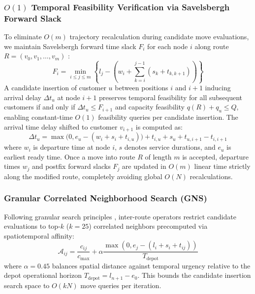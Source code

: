 \documentclass{ieeeaccess}
\begin{document}
\subsubsection{\texorpdfstring{$O(1)$}{O(1)} Temporal Feasibility Verification via Savelsbergh Forward Slack}
To eliminate $O(m)$ trajectory recalculation during candidate move evaluations, we maintain Savelsbergh forward time slack $F_i$ for each node $i$ along route $R = (v_0, v_1, \dots, v_m)$ \cite{savelsbergh1992general}:
\begin{equation}
  F_i = \min_{i \le j \le m} \left\{ l_j - \left( w_i + \sum_{k=i}^{j-1} (s_k + t_{k, k+1}) \right) \right\}
  \label{eq:forward_slack}
\end{equation}
A candidate insertion of customer $u$ between positions $i$ and $i+1$ inducing arrival delay $\Delta t_u$ at node $i+1$ preserves temporal feasibility for all subsequent customers if and only if $\Delta t_u \le F_{i+1}$ and capacity feasibility $q(R) + q_u \le Q$, enabling constant-time $O(1)$ feasibility queries per candidate insertion. The arrival time delay shifted to customer $v_{i+1}$ is computed as:
\begin{equation}
  \Delta t_u = \max\bigl(0, e_u - (w_i + s_i + t_{i, u})\bigr) + t_{i, u} + s_u + t_{u, i+1} - t_{i, i+1}
  \label{eq:delta_t_insertion}
\end{equation}
where $w_i$ is departure time at node $i$, $s$ denotes service durations, and $e_u$ is earliest ready time. Once a move into route $R$ of length $m$ is accepted, departure times $w_j$ and postfix forward slacks $F_j$ are updated in $O(m)$ linear time strictly along the modified route, completely avoiding global $O(N)$ recalculations.

\subsubsection{Granular Correlated Neighborhood Search (GNS)}
Following granular search principles \cite{toth2003granular}, inter-route operators restrict candidate evaluations to top-$k$ ($k=25$) correlated neighbors precomputed via spatiotemporal affinity:
\begin{equation}
  \mathcal{A}_{ij} = \frac{c_{ij}}{c_{\max}} + \alpha \frac{\max(0, e_j - (l_i + s_i + t_{ij}))}{T_{\text{depot}}}
  \label{eq:granular_affinity}
\end{equation}
where $\alpha = 0.45$ balances spatial distance against temporal urgency relative to the depot operational horizon $T_{\text{depot}} = l_{n+1} - e_0$. This bounds the candidate insertion search space to $O(k N)$ move queries per iteration.
\end{document}
